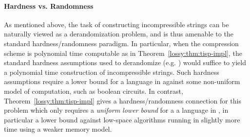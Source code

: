 \paragraph{Hardness vs. Randomness}
As mentioned above, the task of constructing incompressible strings can be naturally viewed as a derandomization problem, and is thus amenable to the standard hardness/randomness paradigm. In particular, when the compression scheme is polynomial time computable as in Theorem~\ref{lossy:thm:tisp-impl}, the standard hardness assumptions used to derandomize  (e.g. \cite{IW}) would suffice to yield a polynomial time construction of incompressible strings. Such hardness assumptions require a lower bound for a language in  against some non-uniform model of computation, such as boolean circuits. In contrast, Theorem~\ref{lossy:thm:tisp-impl} gives a hardness/randomness connection for this problem which only requires a \emph{uniform lower bound} for a a language in , in particular a lower bound against low-space algorithms running in slightly more time using a weaker memory model.


